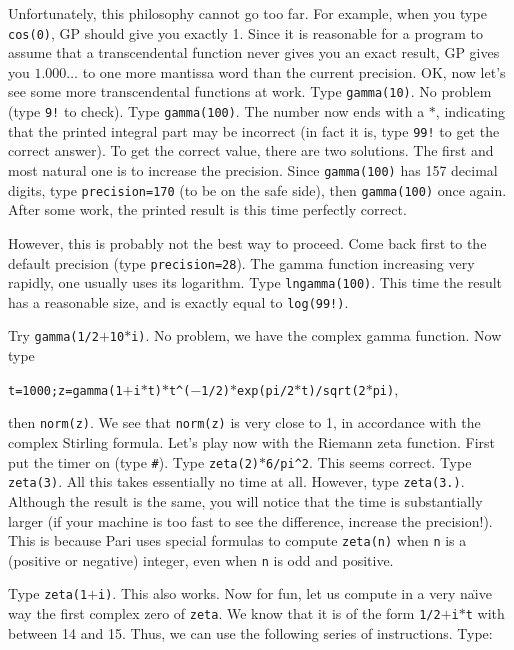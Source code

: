 Unfortunately, this philosophy cannot go too far. For example, when you
type {\tt cos(0)}, GP should give you exactly 1. Since it is reasonable for
a program to assume that a transcendental function never gives you an exact
result, GP gives you $1.000\dots$ to one more mantissa word than the current
precision.
\medskip
OK, now let's see some more transcendental functions at work. Type
{\tt gamma(10)}. No problem (type {\tt 9!} to check). Type {\tt gamma(100)}.
The number now ends with a $*$, indicating that the printed integral part
may be incorrect (in fact it is, type {\tt 99!} to get the correct answer).
To get the correct value, there are two solutions. The first and most natural
one is to increase the precision. Since {\tt gamma(100)} has 157 decimal
digits, type {\tt\bs precision=170} (to be on the safe side), then
{\tt gamma(100)} once again. After some work, the printed result is this time
perfectly correct.

However, this is probably not the best way to proceed. Come back first to
the default precision (type {\tt\bs precision=28}). The gamma function 
increasing very rapidly, one usually uses its logarithm. Type 
{\tt lngamma(100)}. This time the result has a reasonable size, and is
exactly equal to {\tt log(99!)}.

Try {\tt gamma(1/2$+$10$*$i)}. No problem, we have the complex gamma function.
Now type 

{\tt t=1000;z=gamma(1$+$i$*$t)$*$t\^{}($-$1/2)$*$exp(pi/2$*$t)/sqrt(2$*$pi)},

then {\tt norm(z)}. We see that {\tt norm(z)} is very close to 1, in accordance
with the complex Stirling formula.
\smallskip
Let's play now with the Riemann zeta function. First put the timer on (type
{\tt \#}). Type {\tt zeta(2)$*$6/pi\^{}2}. This seems correct. Type 
{\tt zeta(3)}. All this takes essentially no time at all. However, type
{\tt zeta(3.)}. Although the result is the same, you will notice that the
time is substantially larger (if your machine is too fast to see the 
difference, increase the precision!). This is because Pari uses special 
formulas to compute {\tt zeta(n)} when {\tt n} is a (positive or negative)
integer, even when {\tt n} is odd and positive.

Type {\tt zeta(1$+$i)}. This also works. Now for fun, let us compute in a very
na\"\i ve way the first complex zero of {\tt zeta}. We know that it is of the
form {\tt 1/2$+$i$*$t} with between 14 and 15. Thus, we can use the following
series of instructions. Type:

